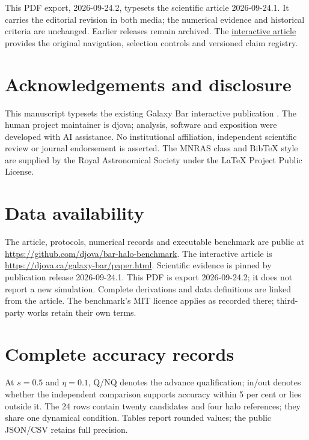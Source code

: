 \documentclass[fleqn,usenatbib]{mnras}
\begin{document}
This PDF export, 2026-09-24.2, typesets the scientific article 2026-09-24.1. It carries the editorial revision in both media; the numerical evidence and historical criteria are unchanged. Earlier releases remain archived. The \href{https://djova.ca/galaxy-bar/paper.html}{interactive article} provides the original navigation, selection controls and versioned claim registry.

\section*{Acknowledgements and disclosure}
This manuscript typesets the existing Galaxy Bar interactive publication \citep{GalaxyBar2026}. The human project maintainer is djova; analysis, software and exposition were developed with AI assistance. No institutional affiliation, independent scientific review or journal endorsement is asserted. The MNRAS class and BibTeX style are supplied by the Royal Astronomical Society under the LaTeX Project Public License.
\section*{Data availability}
The article, protocols, numerical records and executable benchmark are public at \url{https://github.com/djova/bar-halo-benchmark}. The interactive article is \url{https://djova.ca/galaxy-bar/paper.html}. Scientific evidence is pinned by publication release 2026-09-24.1. This PDF is export 2026-09-24.2; it does not report a new simulation. Complete derivations and data definitions are linked from the article. The benchmark's MIT licence applies as recorded there; third-party works retain their own terms.


\clearpage
\onecolumn
\makeatletter
\def\fps@table{!h}
\makeatother
\appendix
\renewcommand{\theHtable}{\thesection.\arabic{table}}
\section{Complete accuracy records}\label{app-accuracy}

At \(s=0.5\) and \(\eta=0.1\), Q/NQ denotes the advance qualification; in/out denotes whether the independent comparison supports accuracy within 5 per cent or lies outside it. The 24 rows contain twenty candidates and four halo references; they share one dynamical condition. Tables report rounded values; the public JSON/CSV retains full precision.
\end{document}
